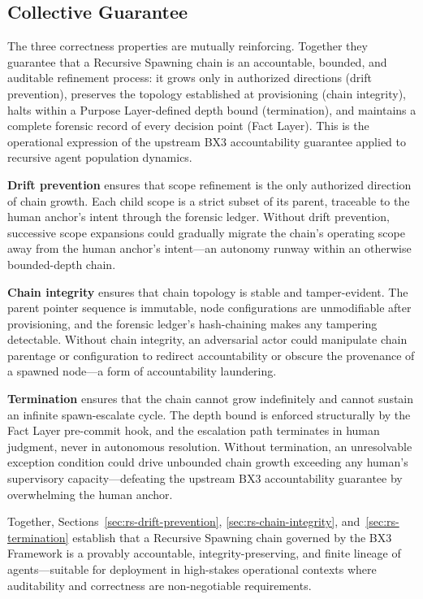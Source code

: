 \subsection{Collective Guarantee}
\label{sec:rs-collective-guarantee}

The three correctness properties are mutually reinforcing. Together they guarantee that a Recursive Spawning chain is an accountable, bounded, and auditable refinement process: it grows only in authorized directions (drift prevention), preserves the topology established at provisioning (chain integrity), halts within a Purpose Layer-defined depth bound (termination), and maintains a complete forensic record of every decision point (Fact Layer). This is the operational expression of the upstream BX3 accountability guarantee applied to recursive agent population dynamics.

\textbf{Drift prevention} ensures that scope refinement is the only authorized direction of chain growth. Each child scope is a strict subset of its parent, traceable to the human anchor's intent through the forensic ledger. Without drift prevention, successive scope expansions could gradually migrate the chain's operating scope away from the human anchor's intent---an autonomy runway within an otherwise bounded-depth chain.

\textbf{Chain integrity} ensures that chain topology is stable and tamper-evident. The parent pointer sequence is immutable, node configurations are unmodifiable after provisioning, and the forensic ledger's hash-chaining makes any tampering detectable. Without chain integrity, an adversarial actor could manipulate chain parentage or configuration to redirect accountability or obscure the provenance of a spawned node---a form of accountability laundering.

\textbf{Termination} ensures that the chain cannot grow indefinitely and cannot sustain an infinite spawn-escalate cycle. The depth bound is enforced structurally by the Fact Layer pre-commit hook, and the escalation path terminates in human judgment, never in autonomous resolution. Without termination, an unresolvable exception condition could drive unbounded chain growth exceeding any human's supervisory capacity---defeating the upstream BX3 accountability guarantee by overwhelming the human anchor.

Together, Sections~\ref{sec:rs-drift-prevention}, \ref{sec:rs-chain-integrity}, and~\ref{sec:rs-termination} establish that a Recursive Spawning chain governed by the BX3 Framework is a provably accountable, integrity-preserving, and finite lineage of agents---suitable for deployment in high-stakes operational contexts where auditability and correctness are non-negotiable requirements.